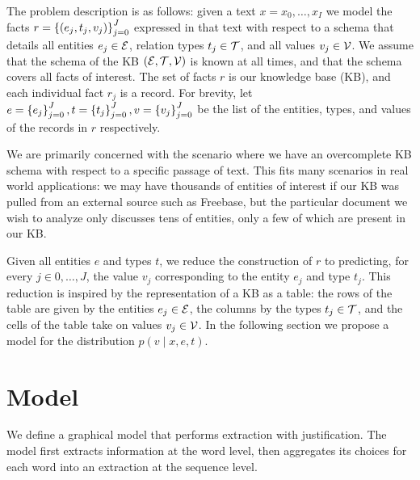 \documentclass[12pt]{article}
\begin{document}
The problem description is as follows:
given a text $x = x_0, \ldots, x_{I}$ we model the facts
$r = \left\{(e_j, t_j, v_j)\right\}_{j=0}^J$ expressed in that text
with respect to a schema that details all entities $e_j \in \mathcal{E}$,
relation types $t_j \in \mathcal{T}$, and all values $v_j \in \mathcal{V}$.
We assume that the schema of the KB $(\mathcal{E}, \mathcal{T}, \mathcal{V})$ is known at all times,
and that the schema covers all facts of interest.
The set of facts $r$ is our knowledge base (KB),
and each individual fact $r_j$ is a record.
For brevity, let $e = \left\{e_j\right\}_{j=0}^J, t = \left\{t_j\right\}_{j=0}^J, v = \left\{v_j\right\}_{j=0}^J$
be the list of the entities, types, and values of the records in $r$ respectively.

We are primarily concerned with the scenario where we have an overcomplete KB schema with
respect to a specific passage of text.
This fits many scenarios in real world applications:
we may have thousands of entities of interest if our KB was pulled from an 
external source such as Freebase,
but the particular document we wish to analyze only discusses tens of entities,
only a few of which are present in our KB.

Given all entities $e$ and types $t$,
we reduce the construction of $r$ to predicting, for every $j\in 0,\ldots,J$,
the value $v_j$ corresponding to the entity $e_j$ and type $t_j$.
This reduction is inspired by the representation of a KB as a table:
the rows of the table are given by the entities $e_j \in \mathcal{E}$,
the columns by the types $t_j \in \mathcal{T}$,
and the cells of the table take on values $v_j \in \mathcal{V}$.
In the following section we propose a model for the distribution $p(v \mid x, e, t)$.

\section{Model}
We define a graphical model that performs extraction with justification. 
The model first extracts information at the word level,
then aggregates its choices for each word into an extraction at the sequence level.
\end{document}
